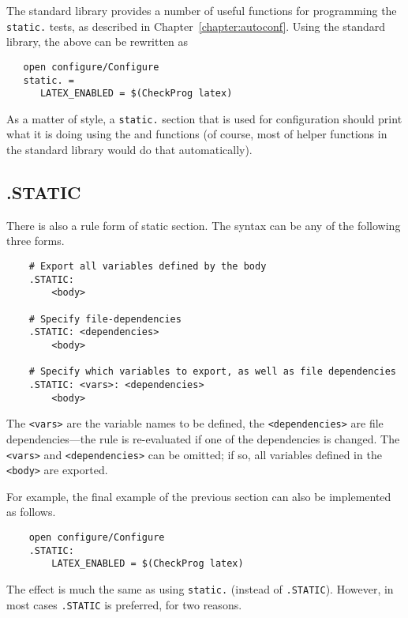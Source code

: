 The \OMake standard library provides a number of useful functions for
programming the \verb+static.+ tests, as described in
Chapter~\ref{chapter:autoconf}. Using the standard library, the above can
be rewritten as

\begin{verbatim}
   open configure/Configure
   static. =
      LATEX_ENABLED = $(CheckProg latex)
\end{verbatim}

As a matter of style, a \verb+static.+ section that is used for configuration should print what it
is doing using the  and
 functions (of course, most of helper functions in
the standard library would do that automatically).

\subsection{.STATIC}
\label{section:.STATIC}

\newinreorg

There is also a rule form of static section.  The syntax can be any of the following three forms.

\begin{verbatim}
    # Export all variables defined by the body
    .STATIC:
        <body>

    # Specify file-dependencies
    .STATIC: <dependencies>
        <body>

    # Specify which variables to export, as well as file dependencies
    .STATIC: <vars>: <dependencies>
        <body>
\end{verbatim}

The \verb+<vars>+ are the variable names to be defined, the \verb+<dependencies>+ are file
dependencies---the rule is re-evaluated if one of the dependencies is changed.  The \verb+<vars>+
and \verb+<dependencies>+ can be omitted; if so, all variables defined in the \verb+<body>+ are
exported.

For example, the final example of the previous section can also be implemented as follows.

\begin{verbatim}
    open configure/Configure
    .STATIC:
        LATEX_ENABLED = $(CheckProg latex)
\end{verbatim}
%
The effect is much the same as using \verb+static.+ (instead of \verb+.STATIC+).  However, in most
cases \verb+.STATIC+ is preferred, for two reasons.

